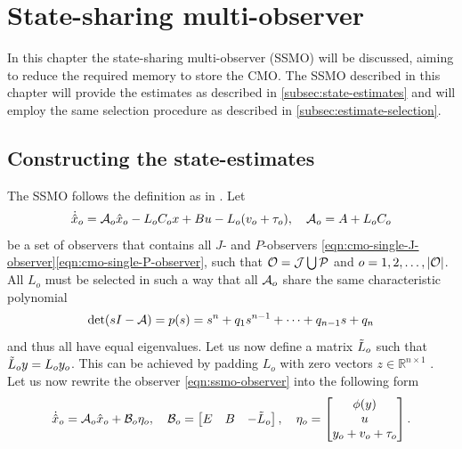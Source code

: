\section{State-sharing multi-observer}\label{ch:ssmo}
In this chapter the state-sharing multi-observer (SSMO) will be discussed, aiming to reduce the required memory to store the CMO. The SSMO described in this chapter will provide the estimates as described in \autoref{subsec:state-estimates} and will employ the same selection procedure as described in \autoref{subsec:estimate-selection}.

\subsection{Constructing the state-estimates}
The SSMO follows the definition as in \cite{Chong2023MemoryAlgorithms}. Let
\begin{equation}\label{eqn:ssmo-observer}
    \begin{split}
        \dot{\hat{x}}_o &= \mathcal{A}_o\hat{x}_o - L_oC_ox + Bu -L_o(v_o + \tau_o), \quad \mathcal{A}_o=A+L_{o}C_{o} \\
    \end{split}
\end{equation}
be a set of observers that contains all $J$- and $P$-observers \eqref{eqn:cmo-single-J-observer}\eqref{eqn:cmo-single-P-observer}, such that $\mathcal{O}=\mathcal{J}\bigcup\mathcal{P}$ and $o=1,2,\dots,|\mathcal{O}|$. All $L_o$ must be selected in such a way that all $\mathcal{A}_o$ share the same characteristic polynomial
\begin{equation}\label{eqn:ssmo-char-poly}
    \det(sI-\mathcal{A}) = p(s) = s^n + q_1s^{n-1} + \dots + q_{n-1}s + q_n
\end{equation}
and thus all have equal eigenvalues. Let us now define a matrix $\Tilde{L}_{o}$ such that $\Tilde{L}_oy=L_oy_o$. This can be achieved by padding $L_o$ with zero vectors $z \in \mathbb{R}^{n \times 1}$ \cite{Chong2023MemoryAlgorithms}. Let us now rewrite the observer \eqref{eqn:ssmo-observer} into the following form
\begin{equation}\label{eqn:ssmo-standard-system-form}
    \dot{\hat{x}}_o = \mathcal{A}_o\hat{x}_o + \mathcal{B}_o\eta_o, \quad
    \mathcal{B}_o =
    \begin{bmatrix}
        E & B & -\Tilde{L}_o \\
    \end{bmatrix}, \quad \eta_o =
    \begin{bmatrix}
        \phi(y) \\
        u \\
        y_o + v_o + \tau_o
    \end{bmatrix}.
\end{equation}


